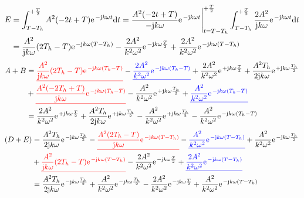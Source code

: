 \documentclass[11pt,a4paper,DIV=12]{scrartcl}
\begin{document}
%
%
%
\begin{align}
	E&=\int_{T-T_h}^{+\frac{T}{2}}A^2(-2t+T)\e^{-\im k \omega t}\diff t=\frac{A^2(-2t+T)}{-\im k \omega}\e^{-\im k \omega t}\Bigg |_{t=T-T_h}^{+\frac{T}{2}}\int_{T-T_h}^{+\frac{T}{2}}\frac{2A^2}{\im k \omega}\e^{-\im k \omega t}\diff t\nonumber \\
	&=\frac{A^2}{\im k \omega}(2T_h-T)\e^{-\im k \omega (T-T_h)}-\frac{2A^2}{k^2\omega^2}\e^{-\im k \omega \frac{T}{2}}+\frac{2A^2}{k^2\omega^2}\e^{-\im k \omega (T-T_h)}
\end{align}
%
%
%
\begin{align}
	A+B&=\ured{\frac{A^2}{\im k \omega}(2T_h-T)\e^{-\im k \omega (T_h-T)}}-\ublue{\frac{2A^2}{k^2\omega^2}\e^{-\im k \omega (T_h-T)}}+\frac{2A^2}{k^2\omega^2}\e^{+\im k \omega \frac{T}{2}}+\frac{A^2T_h}{2\im k \omega}\e^{+\im k \omega \frac{T_h}{2}}\nonumber \\
	&+\ured{\frac{A^2(-2T_h+T)}{\im k \omega}\e^{-\im k \omega (T_h-T)}}-\frac{A^2}{k^2\omega^2}\e^{+\im k \omega \frac{T_h}{2}}+\ublue{\frac{A^2}{k^2\omega^2}\e^{-\im k \omega (T_h-T)}}\nonumber \\
	&=\frac{2A^2}{k^2\omega^2}\e^{+\im k \omega \frac{T}{2}}+\frac{A^2T_h}{2\im k \omega}\e^{+\im k \omega \frac{T_h}{2}}-\frac{A^2}{k^2\omega^2}\e^{+\im k \omega\frac{T_h}{2}}-\frac{A^2}{k^2\omega^2}\e^{-\im k \omega (T_h-T)}
\end{align}
%
%
%
\begin{align}
	(D+E)&=\frac{A^2T_h}{2\im k \omega}\e^{-\im k \omega \frac{T_h}{2}}-\ured{\frac{A^2(2T_h-T)}{\im k \omega}\e^{-\im k \omega (T-T_h)}}-\ublue{\frac{A^2}{k^2\omega^2}\e^{-\im k \omega (T-T_h)}}+\frac{A^2}{ k^2 \omega^2}\e^{-\im k \omega \frac{T_h}{2}}\nonumber \\
	&+\ured{\frac{A^2}{\im k \omega}(2T_h-T)\e^{-\im k \omega (T-T_h)}}-\frac{2A^2}{k^2\omega^2}\e^{-\im k \omega \frac{T}{2}}+\ublue{\frac{2A^2}{k^2\omega^2}\e^{-\im k \omega (T-T_h)}}\nonumber\\
	&=\frac{A^2T_h}{2\im k \omega}\e^{-\im k \omega \frac{T_h}{2}}+\frac{A^2}{ k^2 \omega^2}\e^{-\im k \omega \frac{T_h}{2}}-\frac{2A^2}{k^2\omega^2}\e^{-\im k \omega \frac{T}{2}}+\frac{A^2}{k^2\omega^2}\e^{-\im k \omega (T-T_h)}
\end{align}
%
%
%
\end{document}
